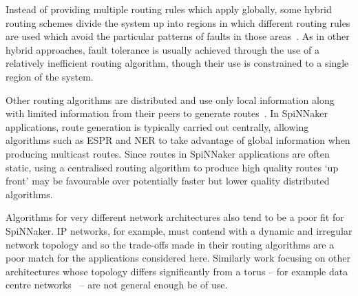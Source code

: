 			Instead of providing multiple routing rules which apply globally, some
			hybrid routing schemes divide the system up into regions in which
			different routing rules are used which avoid the particular patterns of
			faults in those areas~\cite{mejia06,boppana95}. As in other hybrid
			approaches, fault tolerance is usually achieved through the use of a
			relatively inefficient routing algorithm, though their use is constrained
			to a single region of the system.
			
			Other routing algorithms are distributed and use only local information
			along with limited information from their peers to generate
			routes~\cite{fick09b}. In SpiNNaker applications, route generation is
			typically carried out centrally, allowing algorithms such as ESPR and NER
			to take advantage of global information when producing multicast routes.
			Since routes in SpiNNaker applications are often static, using a
			centralised routing algorithm to produce high quality routes `up front'
			may be favourable over potentially faster but lower quality distributed
			algorithms.
			
			Algorithms for very different network architectures also tend to be a
			poor fit for SpiNNaker. IP networks, for example, must contend with a
			dynamic and irregular network topology and so the trade-offs made in
			their routing algorithms are a poor match for the applications considered
			here.  Similarly work focusing on other architectures whose topology
			differs significantly from a torus -- for example data centre
			networks~\cite{guo08,liao12} -- are not general enough be of use.
			
	
